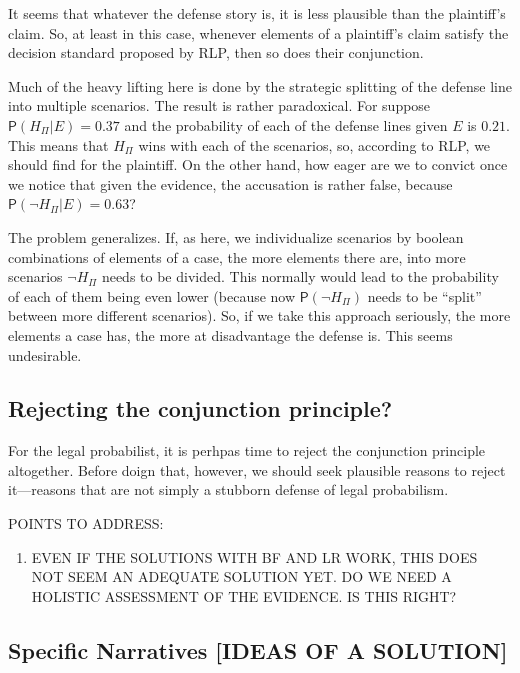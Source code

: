 \documentclass[10pt,dvipsnames,enabledeprecatedfontcommands]{scrartcl}
\providecommand{\tightlist}{%
  \setlength{\itemsep}{0pt}\setlength{\parskip}{0pt}}
\newcommand{\n}{\neg}
\newcommand{\pr}[1]{\mathsf{P}(#1)}
\begin{document}
\noindent It seems that whatever the defense story is, it is less
plausible than the plaintiff's claim. So, at least in this case,
whenever elements of a plaintiff's claim satisfy the decision standard
proposed by RLP, then so does their conjunction.

Much of the heavy lifting here is done by the strategic splitting of the
defense line into multiple scenarios. The result is rather paradoxical.
For suppose \(\pr{H_\Pi\vert E}=0.37\) and the probability of each of
the defense lines given \(E\) is \(0.21\). This means that \(H_\Pi\)
wins with each of the scenarios, so, according to RLP, we should find
for the plaintiff. On the other hand, how eager are we to convict once
we notice that given the evidence, the accusation is rather false,
because \(\pr{\n H_\Pi\vert E}=0.63\)?

The problem generalizes. If, as here, we individualize scenarios by
boolean combinations of elements of a case, the more elements there are,
into more scenarios \(\n H_\Pi\) needs to be divided. This normally
would lead to the probability of each of them being even lower (because
now \(\pr{\n H_\Pi}\) needs to be ``split'' between more different
scenarios). So, if we take this approach seriously, the more elements a
case has, the more at disadvantage the defense is. This seems
undesirable.

\hypertarget{rejecting-the-conjunction-principle}{%
\subsection{Rejecting the conjunction
principle?}\label{rejecting-the-conjunction-principle}}

For the legal probabilist, it is perhpas time to reject the conjunction
principle altogether. Before doign that, however, we should seek
plausible reasons to reject it---reasons that are not simply a stubborn
defense of legal probabilism.

POINTS TO ADDRESS:

\begin{enumerate}
\def\labelenumi{(\arabic{enumi})}
\tightlist
\item
  EVEN IF THE SOLUTIONS WITH BF AND LR WORK, THIS DOES NOT SEEM AN
  ADEQUATE SOLUTION YET. DO WE NEED A HOLISTIC ASSESSMENT OF THE
  EVIDENCE. IS THIS RIGHT?
\end{enumerate}

\hypertarget{specific-narratives-ideas-of-a-solution}{%
\subsection{Specific Narratives {[}IDEAS OF A
SOLUTION{]}}\label{specific-narratives-ideas-of-a-solution}}
\end{document}
